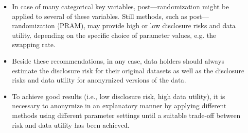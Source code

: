 \documentclass{beamer}
\begin{document}
\begin{frame}
\begin{itemize}
\item In case of many categorical key variables, post—randomization might be applied
to several of these variables. Still methods, such as post—randomization (PRAM),
may provide high or low disclosure risks and data utility, depending on the speciﬁc
choice of parameter values, e.g. the swapping rate.
\end{itemize}
\end{frame}
\begin{frame}
\begin{itemize}
		\item Beside these recommendations, in any case, data holders should always estimate
the disclosure risk for their original datasets as well as the disclosure risks and
data utility for anonyrnized versions of the data. 
\item To achieve good results (i.e., low
disclosure risk, high data utility), it is necessary to anonyrnize in an explanatory
manner by applying different methods using different parameter settings until a
suitable trade-off between risk and data utility has been achieved.
\end{itemize}
\end{frame}
\end{document}
